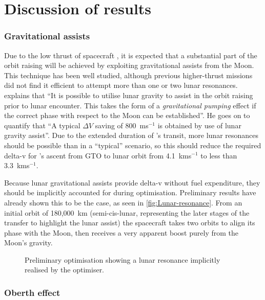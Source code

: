 \chapter{Discussion of results} \label{cha:Discussion-of-results}

\subsection{Gravitational assists} \label{sub:Grav-assist}

Due to the low thrust of spacecraft \BW, it is expected that a substantial part of the orbit raising will be achieved by exploiting gravitational assists from the Moon. This technique has been well studied, although previous higher-thrust missions did not find it efficient to attempt more than one or two lunar resonances. \textcite{Kemble2006} explains that \enquote{It is possible to utilise lunar gravity to assist in the orbit raising prior to lunar encounter. This takes the form of a \emph{gravitational pumping} effect if the correct phase with respect to the Moon can be established}. He goes on to quantify that \enquote{A typical $\Delta V$ saving of 800~ms$^{-1}$ is obtained by use of lunar gravity assist}. Due to the extended duration of \BW's transit, more lunar resonances should be possible than in a \enquote{typical} scenario, so this should reduce the required delta-v for \BW's ascent from GTO to lunar orbit from 4.1~kms$^{-1}$ to less than 3.3~kms$^{-1}$.

Because lunar gravitational assists provide delta-v without fuel expenditure, they should be implicitly accounted for during optimisation. Preliminary results have already shown this to be the case, as seen in \autoref{fig:Lunar-resonance}. From an initial orbit of 180,000~km (semi-cis-lunar, representing the later stages of the transfer to highlight the lunar assist) the spacecraft takes two orbits to align its phase with the Moon, then receives a very apparent boost purely from the Moon's gravity.

\begin{figure}
\centering
\caption{Preliminary optimisation showing a lunar resonance implicitly realised by the optimiser.}
\label{fig:Lunar-resonance}
\end{figure}

\subsection{Oberth effect} \label{sub:Oberth}

